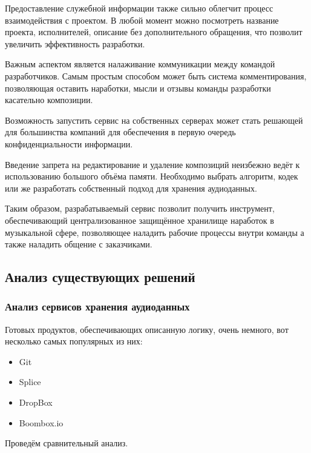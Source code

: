 \documentclass[a4paper, 12pt, oneside]{article}
\begin{document}
Предоставление служебной информации также сильно облегчит процесс взаимодействия с проектом. 
В любой момент можно посмотреть название проекта, исполнителей, описание без дополнительного обращения, что 
позволит увеличить эффективность разработки. 

Важным аспектом является налаживание коммуникации между командой разработчиков. Самым простым способом
может быть система комментирования, позволяющая оставить наработки, мысли и отзывы команды разработки касательно 
композиции.

Возможность запустить сервис на собственных серверах может стать решающей для большинства компаний для 
обеспечения в первую очередь конфиденциальности информации.

Введение запрета на редактирование и удаление композиций неизбежно ведёт к использованию большого объёма памяти. 
Необходимо выбрать алгоритм, кодек или же разработать собственный подход для хранения аудиоданных.

Таким образом, разрабатываемый сервис позволит получить инструмент, обеспечивающий централизованное
защищённое хранилище наработок в музыкальной сфере, позволяющее наладить рабочие процессы внутри команды а также
наладить общение с заказчиками.

\subsection{Анализ существующих решений}

\subsubsection{Анализ сервисов хранения аудиоданных}

Готовых продуктов, обеспечивающих описанную логику, очень немного, вот несколько самых популярных из них:

\begin{itemize}[label=$\bullet$]
	\item Git
	\item Splice
	\item DropBox
	\item Boombox.io
\end{itemize}

Проведём сравнительный анализ.
\end{document}
